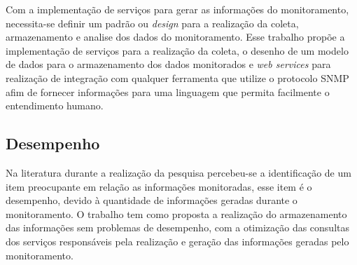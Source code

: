 Com a implementação de serviços para gerar as informações do monitoramento, necessita-se definir um padrão ou \textit{design} para a realização da coleta, armazenamento e analise dos dados do monitoramento. Esse trabalho propõe a implementação de serviços para a realização da coleta, o desenho de um modelo de dados para o armazenamento dos dados monitorados e \textit{web services} para realização de integração com qualquer ferramenta que utilize o protocolo SNMP afim de fornecer informações para uma linguagem que permita facilmente o entendimento humano. 


\subsection{Desempenho}

Na literatura durante a realização da pesquisa percebeu-se a identificação de um item preocupante em relação as informações monitoradas, esse item é o desempenho, devido à quantidade de informações geradas durante o monitoramento. O trabalho tem como proposta a realização do armazenamento das informações sem problemas de desempenho, com a otimização das consultas dos serviços responsáveis pela realização e geração das informações geradas pelo monitoramento.       

